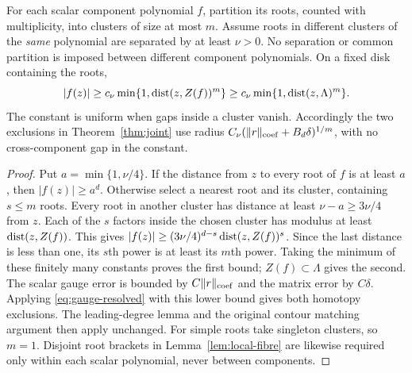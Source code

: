 \begin{lemma}\label{lem:component-clusters}
For each scalar component polynomial $f$, partition its roots, counted
with multiplicity, into clusters of size at most $m$. Assume roots in
different clusters of the \emph{same} polynomial are separated by at
least $\nu>0$. No separation or common partition is imposed between
different component polynomials. On a fixed disk containing the roots,
\begin{equation}\label{eq:componentwise-scalar-lower}
 |f(z)|\ge c_\nu\min\{1,\operatorname{dist}(z,Z(f))^m\}
       \ge c_\nu\min\{1,\operatorname{dist}(z,\Lambda)^m\}.
\end{equation}
The constant is uniform when gaps inside a cluster vanish. Accordingly
the two exclusions in Theorem~\ref{thm:joint} use radius
$C_\nu(\|r\|_{\rm coef}+B_d\delta)^{1/m}$, with no cross-component
gap in the constant.
\end{lemma}
\begin{proof}
Put $a=\min\{1,\nu/4\}$. If the distance from $z$ to every root of
$f$ is at least $a$, then $|f(z)|\ge a^d$. Otherwise select a nearest
root and its cluster, containing $s\le m$ roots. Every root in another
cluster has distance at least $\nu-a\ge3\nu/4$ from $z$. Each of the
$s$ factors inside the chosen cluster has modulus at least
$\operatorname{dist}(z,Z(f))$. This gives
$|f(z)|\ge(3\nu/4)^{d-s}\operatorname{dist}(z,Z(f))^s$.
Since the last distance is less than one, its $s$th power is at least
its $m$th power. Taking the minimum of these finitely many constants
proves the first bound; $Z(f)\subset\Lambda$ gives the second.
The scalar gauge error is bounded by $C\|r\|_{\rm coef}$ and the
matrix error by $C\delta$. Applying \eqref{eq:gauge-resolved} with
this lower bound gives both homotopy exclusions. The leading-degree
lemma and the original contour matching argument then apply unchanged.
For simple roots take singleton clusters, so $m=1$. Disjoint root
brackets in Lemma~\ref{lem:local-fibre} are likewise required only
within each scalar polynomial, never between components.
\end{proof}

